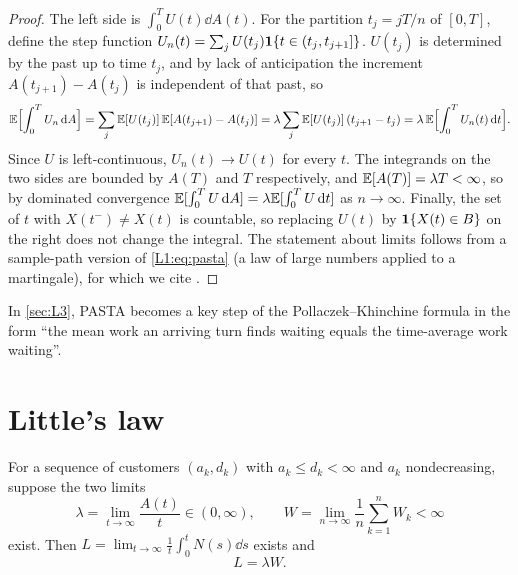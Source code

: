 \begin{proof}
The left side is $\int_0^TU(t)\dd A(t)$. For the partition $t_j=jT/n$ of $[0,T]$,
define the step function $U_n(t)=\sum_{j}U(t_j)\mathbf{1}\{t\in(t_j,t_{j+1}]\}$. $U(t_j)$ is
determined by the past up to time $t_j$, and by lack of anticipation the increment
$A(t_{j+1})-A(t_j)$ is independent of that past, so
\[
  \mathbb{E}\Bigl[\int_0^TU_n\,\mathrm{d} A\Bigr]=\sum_j\mathbb{E}[U(t_j)]\,\mathbb{E}[A(t_{j+1})-A(t_j)]
  =\lambda\sum_j\mathbb{E}[U(t_j)]\,(t_{j+1}-t_j)=\lambda\,\mathbb{E}\Bigl[\int_0^TU_n(t)\,\mathrm{d} t\Bigr].
\]
Since $U$ is left-continuous, $U_n(t)\to U(t)$ for every $t$. The integrands on the
two sides are bounded by $A(T)$ and $T$ respectively, and $\mathbb{E}[A(T)]=\lambda T<\infty$,
so by dominated convergence $\mathbb{E}[\int_0^TU\,\mathrm{d} A]=\lambda\mathbb{E}[\int_0^TU\,\mathrm{d} t]$ as
$n\to\infty$. Finally, the set of $t$ with $X(t^-)\ne X(t)$ is countable, so replacing
$U(t)$ by $\mathbf{1}\{X(t)\in B\}$ on the right does not change the integral.
The statement about limits follows from a sample-path version of
\eqref{L1:eq:pasta} (a law of large numbers applied to a martingale), for which we
cite \cite{wolff1982}.
\end{proof}

In \cref{sec:L3}, PASTA becomes a key step of the Pollaczek--Khinchine formula in the
form ``the mean work an arriving turn finds waiting equals the time-average work
waiting''.

\section{Little's law}

\begin{theorem}\label{thm:little}
For a sequence of customers $(a_k,d_k)$ with $a_k\le d_k<\infty$ and $a_k$
nondecreasing, suppose the two limits
\[
  \lambda=\lim_{t\to\infty}\frac{A(t)}{t}\in(0,\infty),\qquad
  W=\lim_{n\to\infty}\frac1n\sum_{k=1}^nW_k<\infty
\]
exist. Then $L=\lim_{t\to\infty}\frac1t\int_0^tN(s)\dd s$ exists and
\begin{equation}\label{L1:eq:little}
  L=\lambda W .
\end{equation}
\end{theorem}


